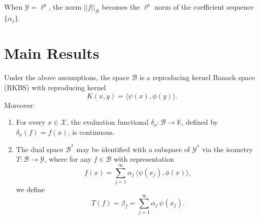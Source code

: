 \begin{remark}
When $\mathcal{Y} = \ell^p$, the norm $||f||_{\mathcal{B}}$ becomes the $\ell^p$ norm of the coefficient sequence $\{\alpha_j\}$.
\end{remark}


\section{Main Results}

\begin{theorem}
Under the above assumptions, the space $\mathcal{B}$ is a reproducing kernel Banach space (RKBS) with reproducing kernel
\begin{equation}
K(x,y)= \langle \psi(x), \phi(y)\rangle.
\end{equation}
Moreover:
\begin{enumerate}
\item For every $x\in\mathcal{X}$, the evaluation functional $\delta_x: \mathcal{B}\to \mathbb{K}$, defined by $\delta_x(f)= f(x)$, is continuous.
\item The dual space $\mathcal{B}^*$ may be identified with a subspace of $\mathcal{Y}^*$ via the isometry $T: \mathcal{B}\to \mathcal{Y}$, where for any $f \in \mathcal{B}$ with representation
\begin{equation}
f(x) = \sum_{j=1}^\infty \alpha_j\, \langle \psi(x_j), \phi(x)\rangle,
\end{equation}
we define
\begin{equation}
T(f) = \beta_f = \sum_{j=1}^\infty \alpha_j\,\psi(x_j).
\end{equation}
\end{enumerate}
\end{theorem}

